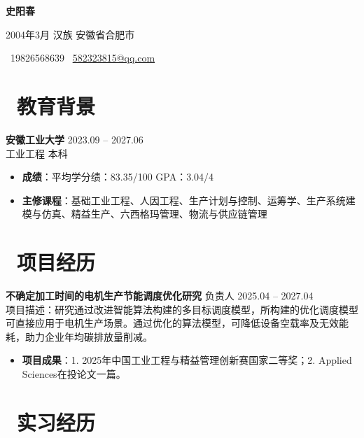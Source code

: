 \documentclass[11pt]{article}
\newlength{\intraProjectTitleSep}
\newcommand{\titlebreak}{\\[\intraProjectTitleSep]}
\newlength{\intraProjectListTopSep}
\begin{document}


\centerline{\LARGE\bfseries{史阳春}} 
\vspace{0.5em}
\centerline{\normalsize{2004年3月 \quad 汉族 \quad 安徽省合肥市}} 
\vspace{0.3em}
\centerline{\normalsize{\faPhone\ 19826568639 \quad \faEnvelopeO\ \href{mailto:582323815@qq.com}{582323815@qq.com}}} 
    
\section{\makebox[\widthof{\faGraduationCap}][c]{\color{CVBlue}\faGraduationCap}\ 教育背景}    
\textbf{安徽工业大学} \hfill 2023.09 -- 2027.06\\[0.5em] 
工业工程 \quad 本科
\begin{itemize}[nosep]
    \item \textbf{成绩}：平均学分绩：83.35/100 \quad GPA：3.04/4
    \item \textbf{主修课程}：基础工业工程、人因工程、生产计划与控制、运筹学、生产系统建模与仿真、精益生产、六西格玛管理、物流与供应链管理
\end{itemize}

\section{\makebox[\widthof{\faUsers}][c]{\color{CVBlue}\faUsers}\ 项目经历}

\textbf{不确定加工时间的电机生产节能调度优化研究} \quad 负责人 \hfill 2025.04 -- 2027.04 \titlebreak
项目描述：研究通过改进智能算法构建的多目标调度模型，所构建的优化调度模型可直接应用于电机生产场景。通过优化的算法模型，可降低设备空载率及无效能耗，助力企业年均碳排放量削减。
\begin{itemize}[nosep, topsep=\intraProjectListTopSep]
    \item \textbf{项目成果}：1. 2025年中国工业工程与精益管理创新赛国家二等奖；2. Applied Sciences在投论文一篇。
\end{itemize}

\section{\makebox[\widthof{\faBriefcase}][c]{\color{CVBlue}\faBriefcase}\ 实习经历}
\end{document}
